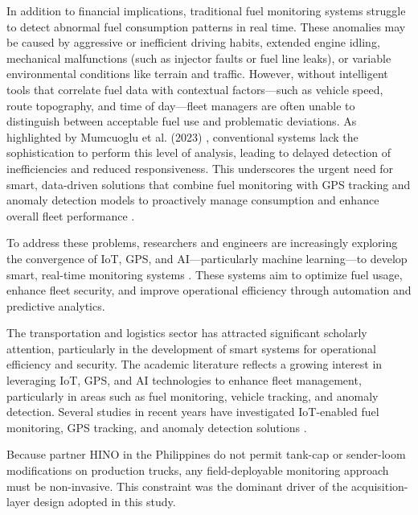 In addition to financial implications, traditional fuel monitoring systems struggle to detect abnormal fuel consumption patterns in real time. These anomalies may be caused by aggressive or inefficient driving habits, extended engine idling, mechanical malfunctions (such as injector faults or fuel line leaks), or variable environmental conditions like terrain and traffic. However, without intelligent tools that correlate fuel data with contextual factors—such as vehicle speed, route topography, and time of day—fleet managers are often unable to distinguish between acceptable fuel use and problematic deviations. As highlighted by Mumcuoglu et al. (2023) \cite{mumcuoglu2023fuel}, conventional systems lack the sophistication to perform this level of analysis, leading to delayed detection of inefficiencies and reduced responsiveness. This underscores the urgent need for smart, data-driven solutions that combine fuel monitoring with GPS tracking and anomaly detection models to proactively manage consumption and enhance overall fleet performance \cite{barbado2022interpretable, beteto2022anomaly, fortela2023unsupervised}.

To address these problems, researchers and engineers are increasingly exploring the convergence of IoT, GPS, and AI—particularly machine learning—to develop smart, real-time monitoring systems \cite{alquhali2019iot, joshi2024intelligent, prabhu2022iot}. These systems aim to optimize fuel usage, enhance fleet security, and improve operational efficiency through automation and predictive analytics.

The transportation and logistics sector has attracted significant scholarly attention, particularly in the development of smart systems for operational efficiency and security. The academic literature reflects a growing interest in leveraging IoT, GPS, and AI technologies to enhance fleet management, particularly in areas such as fuel monitoring, vehicle tracking, and anomaly detection. Several studies in recent years have investigated IoT-enabled fuel monitoring, GPS tracking, and anomaly detection solutions \cite{g2022real, g2023fuel, patil2024iot, prabhu2022iot, rs2024fuel, s2024iot}.

Because partner HINO in the Philippines do not permit tank-cap or sender-loom modifications on production trucks, any field-deployable monitoring approach must be non-invasive. This constraint was the dominant driver of the acquisition-layer design adopted in this study.

